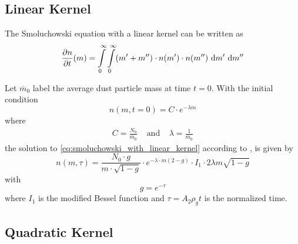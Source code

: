     \clearpage\subsection{Linear Kernel}


    The Smoluchowski equation with a linear kernel can be written as
    \begin{equation}
        \frac{\partial n}{\partial t}(m)
            = 
                \int\limits_0^\infty \int\limits_0^\infty
                (m' + m'') \cdot
                n(m') \cdot n(m'')
                \ \text{d} m' \ \text{d} m''
        \label{eq:smoluchowski_with_linear_kernel}
    \end{equation}

    Let $\overline m_0$ label the average dust particle mass at time $t=0$.
    With the initial condition 
    \begin{equation}
        n(m, t=0) = C \cdot e^{-\lambda m}
    \end{equation}
    where 
    \begin{align}
        C = \frac{N_0}{\overline m_0}
        \ \ \ \ \ \text{and} \ \ \ \ \
        \lambda = \frac{1}{\overline m_0}
    \end{align}
    the solution to \cref{eq:smoluchowski_with_linear_kernel} according to
    \cite{safronov_1963}, \cite{safronov_1972} is given by 
    \begin{equation}
        n(m, \tau) = \frac{N_0 \cdot g}{m \cdot \sqrt{1-g}} \cdot e^{-\lambda \cdot m(2-g)}
        \cdot I_1 \cdot 2\lambda m \sqrt{1-g}
    \end{equation}
    with
    \begin{equation}
        g = e^{-\tau}
    \end{equation}
    where $I_1$ is the modified Bessel function and $\tau = A_2 \rho_g t$ is the normalized time.

    \subsection{Quadratic Kernel}


